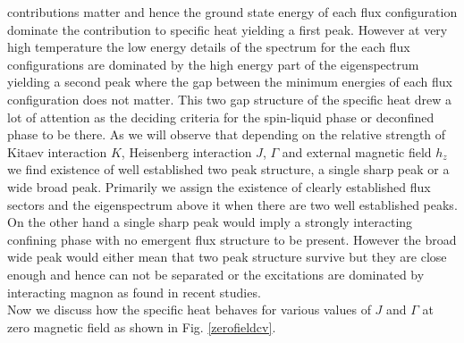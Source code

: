 \documentclass[aps,amsmath,twocolumn,amssymb,floatfix,showpacs,superscriptaddress,nofootinbib,longbibliography]{revtex4-1}
\begin{document}
contributions matter and hence the ground state energy of each  flux configuration dominate the contribution to specific heat yielding a first peak. However at very high temperature the low energy details of the spectrum for the each flux configurations are dominated by the high energy part of the eigenspectrum yielding a second peak where the gap between the minimum energies of each flux configuration does not matter.  This two gap structure of the specific heat drew a lot of attention as the deciding criteria for the spin-liquid phase or deconfined phase to be there. As we will observe that depending on the relative strength of Kitaev interaction $K$, Heisenberg interaction $J$, $\Gamma$ and external magnetic field $h_z$ we find existence of well established two peak structure, a single sharp peak or a wide broad peak. Primarily we assign the existence of clearly established flux sectors and the eigenspectrum above it when there are two well established peaks. On the other hand a single sharp peak would imply a strongly interacting confining phase with no emergent flux structure to be present. However the broad wide peak would either mean that two peak structure survive but they are close enough and hence can not be separated or the excitations are dominated by interacting magnon as found in recent studies.\\
\indent
Now we discuss how the specific heat behaves for various values of $J$ and $\Gamma$ at zero magnetic field as shown in Fig. \ref{zerofieldcv}. 
\end{document}
